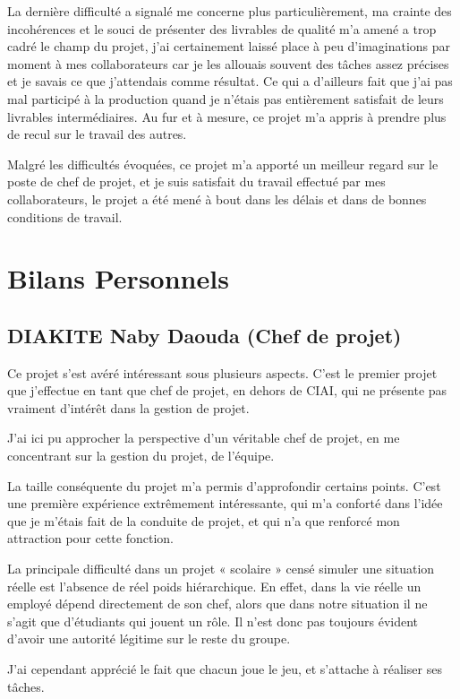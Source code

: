         La dernière difficulté a signalé me concerne plus particulièrement, ma crainte des incohérences et le souci de présenter des livrables de qualité m'a amené a trop cadré le champ du projet, j'ai certainement laissé place à peu d'imaginations par moment à mes collaborateurs car je les allouais souvent des tâches assez précises et je savais ce que j'attendais comme résultat. Ce qui a d'ailleurs fait que j'ai pas mal participé à la production quand je n'étais pas entièrement satisfait de leurs livrables intermédiaires. Au fur et à mesure, ce projet m'a appris à prendre plus de recul sur le travail des autres.

      Malgré les difficultés évoquées, ce projet m'a apporté un meilleur regard sur le poste de chef de projet, et je suis satisfait du travail effectué par mes collaborateurs, le projet a été mené à bout dans les délais et dans de bonnes conditions de travail.


\section{Bilans Personnels}

       \subsection{DIAKITE Naby Daouda (Chef de projet)}

Ce projet s’est avéré intéressant sous plusieurs aspects. C’est le premier projet que j’effectue en tant que chef de projet, en dehors de CIAI, qui ne présente pas vraiment d’intérêt dans la gestion de projet.

J’ai ici pu approcher la perspective d’un véritable chef de projet, en me concentrant sur la gestion du projet, de l’équipe. 

La taille conséquente du projet m’a permis d’approfondir certains points. C’est une première expérience extrêmement intéressante, qui m’a conforté dans l’idée que je m’étais fait de la conduite de projet, et qui n’a que renforcé mon attraction pour cette fonction.

La principale difficulté dans un projet « scolaire » censé simuler une situation réelle est l’absence de réel poids hiérarchique. En effet, dans la vie réelle un employé dépend directement de son chef,  alors que dans notre situation il ne s’agit que d’étudiants qui jouent un rôle. Il n’est donc pas toujours évident d’avoir une autorité légitime sur le reste du groupe.

J’ai cependant apprécié le fait que chacun joue le jeu, et s’attache à réaliser ses tâches.

